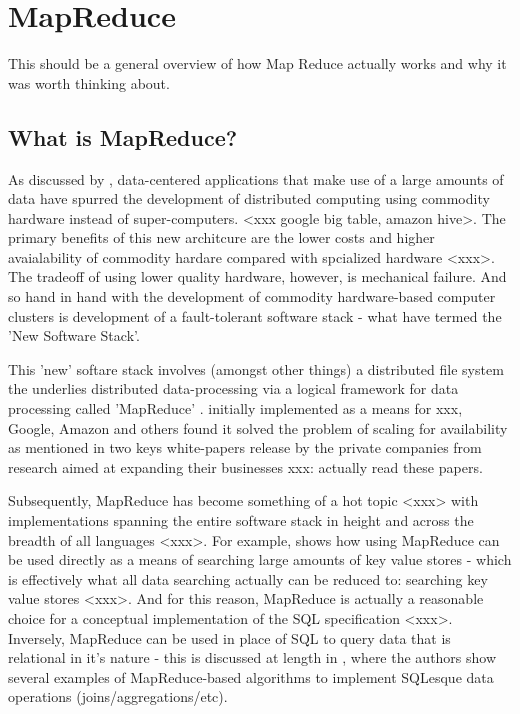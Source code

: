 % 

\section{MapReduce}
This should be a general overview of how Map Reduce actually works and why it was worth thinking about.

\subsection{What is MapReduce?}
As discussed by \cite{mining2011}, data-centered applications that make use of a large amounts of data have spurred the development of distributed computing using commodity hardware instead of super-computers. <xxx google big table, amazon hive>. The primary benefits of this new architcure are the lower costs and higher avaialability of commodity hardare compared with spcialized hardware <xxx>. The tradeoff of using lower quality hardware, however, is mechanical failure. And so hand in hand with the development of commodity hardware-based computer clusters is development of a fault-tolerant software stack - what \cite{mining2011} have termed the 'New Software Stack'.

This 'new' softare stack involves (amongst other things) a distributed file system the underlies distributed data-processing via a logical framework for data processing called 'MapReduce' \cite{mining2011}. initially implemented as a means for xxx, Google, Amazon and others found it solved the problem of scaling for availability as mentioned in two keys white-papers release by the private companies from research aimed at expanding their businesses \cite{google2008,amazon2007} xxx: actually read these papers.

Subsequently, MapReduce has become something of a hot topic <xxx> with implementations spanning the entire software stack in height and across the breadth of all languages <xxx>. For example, \cite{google2010} shows how using MapReduce can be used directly as a means of searching large amounts of key value stores - which is effectively what all data searching actually can be reduced to: searching key value stores <xxx>. And for this reason, MapReduce is actually a reasonable choice for a conceptual implementation of the SQL specification <xxx>. Inversely, MapReduce can be used in place of SQL to query data that is relational in it's nature - this is discussed at length in \cite{mining2011}, where the authors show several examples of MapReduce-based algorithms to implement SQLesque data operations (joins/aggregations/etc).

